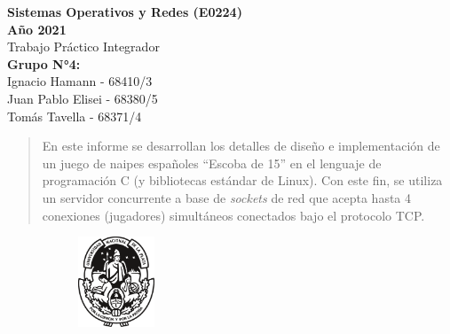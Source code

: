     \begin{titlepage}
        \begin{center}
            \vspace*{0.5cm}
            \huge
            \textbf{Sistemas Operativos y Redes (E0224) \\ Año 2021}    %
            \\
            \vspace{0.5cm}
            Trabajo Práctico Integrador                                       %
            \\
            \vspace{2cm}
            \Large
            \textbf{Grupo N°4:}
            \\
            \large
            \vspace{0.2cm}
            Ignacio Hamann - 68410/3
            \\
            Juan Pablo Elisei - 68380/5
            \\
            Tomás Tavella - 68371/4
            \\
            \vspace{2cm}
            \begin{abstract}
                En este informe se desarrollan los detalles de diseño e implementación de un juego de naipes españoles ``Escoba de 15'' en el lenguaje de programación C (y bibliotecas estándar de Linux). Con este fin, se utiliza un servidor concurrente a base de \textit{sockets} de red que acepta hasta 4 conexiones (jugadores) simultáneos conectados bajo el protocolo TCP.
            \end{abstract}
            \vfill
            \begin{figure}[H]
                \centering
                \begin{subfigure}
                    \centering
                    \includegraphics[width=0.25\textwidth]{Imagenes/UNLP.pdf}
                \end{subfigure}
                \begin{subfigure}
                    \centering

\end{subfigure}
\end{figure}
\end{center}
\end{titlepage}
